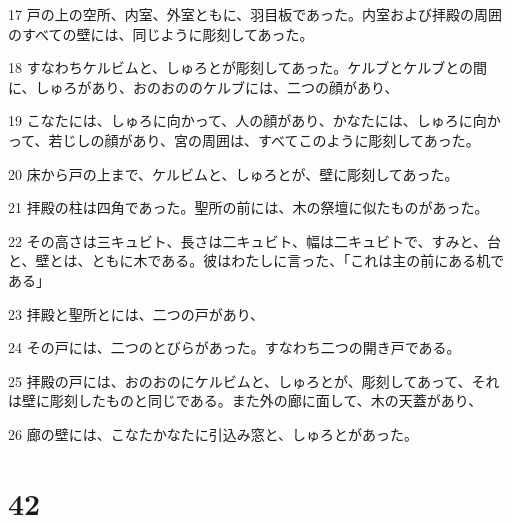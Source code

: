 \par 17 戸の上の空所、内室、外室ともに、羽目板であった。内室および拝殿の周囲のすべての壁には、同じように彫刻してあった。
\par 18 すなわちケルビムと、しゅろとが彫刻してあった。ケルブとケルブとの間に、しゅろがあり、おのおののケルブには、二つの顔があり、
\par 19 こなたには、しゅろに向かって、人の顔があり、かなたには、しゅろに向かって、若じしの顔があり、宮の周囲は、すべてこのように彫刻してあった。
\par 20 床から戸の上まで、ケルビムと、しゅろとが、壁に彫刻してあった。
\par 21 拝殿の柱は四角であった。聖所の前には、木の祭壇に似たものがあった。
\par 22 その高さは三キュビト、長さは二キュビト、幅は二キュビトで、すみと、台と、壁とは、ともに木である。彼はわたしに言った、「これは主の前にある机である」
\par 23 拝殿と聖所とには、二つの戸があり、
\par 24 その戸には、二つのとびらがあった。すなわち二つの開き戸である。
\par 25 拝殿の戸には、おのおのにケルビムと、しゅろとが、彫刻してあって、それは壁に彫刻したものと同じである。また外の廊に面して、木の天蓋があり、
\par 26 廊の壁には、こなたかなたに引込み窓と、しゅろとがあった。

\chapter{42}

